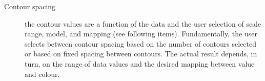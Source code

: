 \documentclass[11pt]{article}
\begin{document}
\begin{description}
  \item[Contour spacing] the contour values are a function of the data and
        the user selection of scale range, model, and mapping (see following
        items).  Fundamentally, the user selects between contour spacing
        based on the number of contours selected or based on fixed spacing
        between contours.  The actual result depends, in turn, on the range
        of data values and the desired mapping between value and colour.
\end{description}
  
\end{document}
